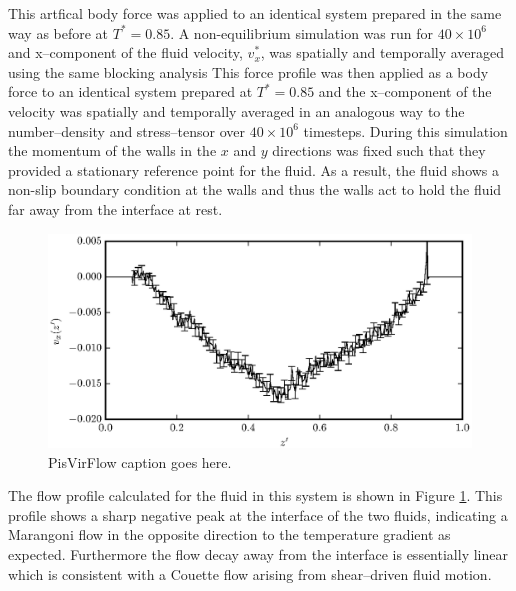 This artfical body force was applied to an identical system prepared in the same way as before at $T^{*} = 0.85$.
A non-equilibrium simulation was run for $40 \times 10^{6}$ and x--component of the fluid velocity, $v^{*}_{x}$, was spatially and temporally averaged using the same blocking analysis 
This force profile was then applied as a body force to an identical system prepared at $T^{*} = 0.85$ and the x--component of the velocity was spatially and temporally averaged in an analogous way to the number--density and stress--tensor over $40 \times 10^{6}$ timesteps.
During this simulation the momentum of the walls in the $x$ and $y$ directions was fixed such that they provided a stationary reference point for the fluid.
As a result, the fluid shows a non-slip boundary condition at the walls and thus the walls act to hold the fluid far away from the interface at rest. 

\begin{figure}[h]
\centering
\includegraphics[scale=0.8]{PisVirFlow}
\caption{PisVirFlow caption goes here.}
\label{PisVirFlow}
\end{figure}
\FloatBarrier
The flow profile calculated for the fluid in this system is shown in Figure \ref{PisVirFlow}. 
This profile shows a sharp negative peak at the interface of the two fluids, indicating a Marangoni flow in the opposite direction to the temperature gradient as expected.
Furthermore the flow decay away from the interface is essentially linear which is consistent with a Couette flow arising from shear--driven fluid motion.








